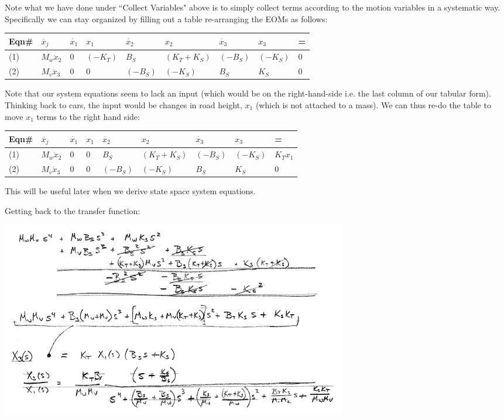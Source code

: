 %
\begin{ExampleCont}
Note what we have done under ``Collect Variables" above is to simply collect terms according to the motion variables in a systematic
way.  Specifically we can stay organized by filling
out a table re-arranging the EOMs as follows:\vspace{0.3in}



\renewcommand\arraystretch{1.5}%


\begin{tabular}{|p{0.35in}|p{0.55in}|p{0.55in}|p{0.55in}|p{0.35in}|p{0.65in}|p{0.55in}|p{0.55in}|p{0.35in}|}\hline
  Eqn\# & $\ddot{x_j}$ & $\dot{x_1}$ & $x_1$  & $\dot{x_2}$ & ${x_2} $& $\dot{x_3}$ & ${x_3} $ &  = \\ \hline
  (1)   & $M_w\ddot{x}_2$ & 0 & $(-K_T)$ & $B_S$    & $(K_T+K_S)$ & $(-B_S)$ & $(-K_S)$ & 0  \\ \hline
  (2)   & $M_v\ddot{x}_3$ & 0 & 0        & $(-B_S)$ & $(-K_S)$    & $B_S$    & $K_S$    & 0 \\ \hline
\end{tabular}

Note that our system equations seem to lack an input (which would be on the right-hand-side i.e. the
last column of our tabular form).  Thinking back to cars, the input would be changes in road height,
$x_1$ (which is not attached to a mass).  We can thus re-do the table to move $x_1$ terms to
the right hand side:

\begin{tabular}{|p{0.35in}|p{0.55in}|p{0.55in}|p{0.55in}|p{0.35in}|p{0.65in}|p{0.55in}|p{0.55in}|p{0.35in}|}\hline
  Eqn\# & $\ddot{x_j}$ & $\dot{x_1}$ & $x_1$  & $\dot{x_2}$ & ${x_2} $& $\dot{x_3}$ & ${x_3} $ &  = \\ \hline
  (1)   & $M_w\ddot{x}_2$ & 0 & $0$ & $B_S$    & $(K_T+K_S)$ & $(-B_S)$ & $(-K_S)$ & $K_Tx_1$ \\ \hline
  (2)   & $M_v\ddot{x}_3$ & 0 & 0        & $(-B_S)$ & $(-K_S)$    & $B_S$    & $K_S$    & 0 \\ \hline
\end{tabular}
This will be useful later when we derive state space system equations.

Getting back to the transfer function:

\includegraphics[width=6.0in]{figs02/00961.png}


\end{ExampleCont}
